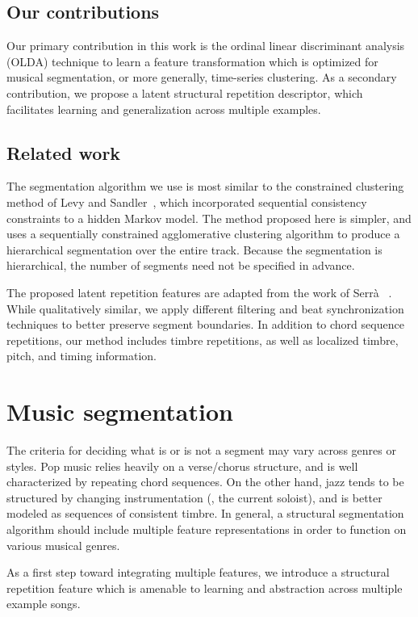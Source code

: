 \documentclass{article}
\begin{document}
\subsection{Our contributions}
Our primary contribution in this work is the ordinal linear discriminant analysis (OLDA) technique to learn a 
feature transformation which is optimized for musical segmentation, or more generally, time-series clustering.
As a secondary contribution, we propose a latent structural repetition descriptor, which facilitates learning and
generalization across multiple examples.

\subsection{Related work}
\label{sec:related}

The segmentation algorithm we use is most similar to the constrained clustering method of Levy and
Sandler~\cite{levy2008structural}, which incorporated sequential consistency constraints to a hidden Markov model. 
The method proposed here is simpler, and uses a sequentially constrained agglomerative clustering algorithm to 
produce a hierarchical segmentation over the entire track.  
Because the segmentation is hierarchical, the number of segments need not be specified in advance.

The proposed latent repetition features are adapted from the work of Serr\`{a}
\etal~\cite{serra2012unsupervised}. While qualitatively similar, we apply different filtering and
beat synchronization techniques to better preserve segment boundaries. 
In addition to chord sequence repetitions, our method includes timbre repetitions, as well as 
localized timbre, pitch, and timing information.

\section{Music segmentation}
\label{sec:features}
The criteria for deciding what is or is not a segment may vary across genres or styles.  
Pop music relies heavily on a verse/chorus structure, and is well characterized by repeating chord sequences. 
On the other hand, jazz tends to be structured by changing instrumentation (\eg, the current soloist),
and is better modeled as sequences of consistent timbre.
In general, a structural segmentation algorithm should include multiple feature representations in order to function
on various musical genres.

As a first step toward integrating multiple features, we introduce a structural repetition feature
which is amenable to learning and abstraction across multiple example songs.
\end{document}

